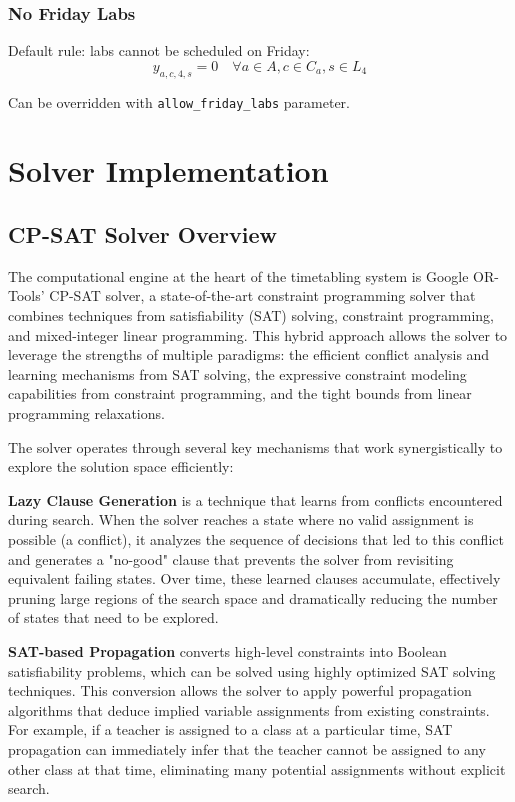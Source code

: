 \documentclass[12pt,a4paper]{article}
\begin{document}
\subsubsection{No Friday Labs}
Default rule: labs cannot be scheduled on Friday:
\begin{equation}
y_{a,c,4,s} = 0 \quad \forall a \in A, c \in C_a, s \in L_4
\end{equation}

Can be overridden with \texttt{allow\_friday\_labs} parameter.

\section{Solver Implementation}

\subsection{CP-SAT Solver Overview}

The computational engine at the heart of the timetabling system is Google OR-Tools' CP-SAT solver, a state-of-the-art constraint programming solver that combines techniques from satisfiability (SAT) solving, constraint programming, and mixed-integer linear programming. This hybrid approach allows the solver to leverage the strengths of multiple paradigms: the efficient conflict analysis and learning mechanisms from SAT solving, the expressive constraint modeling capabilities from constraint programming, and the tight bounds from linear programming relaxations.

The solver operates through several key mechanisms that work synergistically to explore the solution space efficiently:

\textbf{Lazy Clause Generation} is a technique that learns from conflicts encountered during search. When the solver reaches a state where no valid assignment is possible (a conflict), it analyzes the sequence of decisions that led to this conflict and generates a "no-good" clause that prevents the solver from revisiting equivalent failing states. Over time, these learned clauses accumulate, effectively pruning large regions of the search space and dramatically reducing the number of states that need to be explored.

\textbf{SAT-based Propagation} converts high-level constraints into Boolean satisfiability problems, which can be solved using highly optimized SAT solving techniques. This conversion allows the solver to apply powerful propagation algorithms that deduce implied variable assignments from existing constraints. For example, if a teacher is assigned to a class at a particular time, SAT propagation can immediately infer that the teacher cannot be assigned to any other class at that time, eliminating many potential assignments without explicit search.
\end{document}
